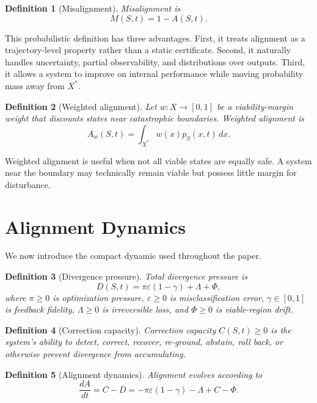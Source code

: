 \documentclass[11pt]{article}
\newtheorem{definition}{Definition}[section]
\newcommand{\Xstar}{X^{\ast}}
\newcommand{\eps}{\varepsilon}
\begin{document}
\begin{definition}[Misalignment]
Misalignment is
\[
M(S,t)=1-A(S,t).
\]
\end{definition}

This probabilistic definition has three advantages. First, it treats alignment as a trajectory-level property rather than a static certificate. Second, it naturally handles uncertainty, partial observability, and distributions over outputs. Third, it allows a system to improve on internal performance while moving probability mass away from \(\Xstar\).

\begin{definition}[Weighted alignment]
Let \(w:X\to[0,1]\) be a viability-margin weight that discounts states near catastrophic boundaries. Weighted alignment is
\[
A_w(S,t)=\int_{\Xstar}w(x)p_S(x,t)\,dx.
\]
\end{definition}

Weighted alignment is useful when not all viable states are equally safe. A system near the boundary may technically remain viable but possess little margin for disturbance.

\section{Alignment Dynamics}

We now introduce the compact dynamic used throughout the paper.

\begin{definition}[Divergence pressure]
Total divergence pressure is
\begin{equation}
D(S,t)=\pi\eps(1-\gamma)+\Lambda+\Phi,
\label{eq:div-pressure}
\end{equation}
where \(\pi\ge0\) is optimization pressure, \(\eps\ge0\) is misclassification error, \(\gamma\in[0,1]\) is feedback fidelity, \(\Lambda\ge0\) is irreversible loss, and \(\Phi\ge0\) is viable-region drift.
\end{definition}

\begin{definition}[Correction capacity]
Correction capacity \(C(S,t)\ge0\) is the system's ability to detect, correct, recover, re-ground, abstain, roll back, or otherwise prevent divergence from accumulating.
\end{definition}

\begin{definition}[Alignment dynamics]
Alignment evolves according to
\begin{equation}
\frac{dA}{dt}=C-D = -\pi\eps(1-\gamma)-\Lambda+C-\Phi.
\label{eq:dynamic}
\end{equation}
\end{definition}
\end{document}
